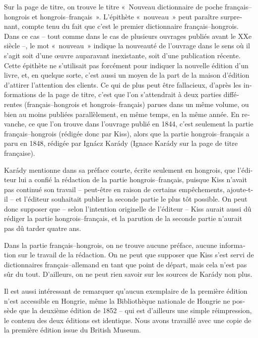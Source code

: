 \documentclass[output=paper,colorlinks,citecolor=brown,arabicfont,chinesefont,booklanguage=french]{langscibook}
\begin{document}
\begin{otherlanguage}{french}
Sur la page de titre, on trouve le titre «~Nouveau dictionnaire de poche français–hongrois et hongrois–français~». L’épithète «~nouveau~» peut paraître surprenant, compte tenu du fait que c’est le premier dictionnaire français–hongrois. Dans ce cas – tout comme dans le cas de plusieurs ouvrages publiés avant le XXe siècle –, le mot «~nouveau~» indique la nouveauté de l’ouvrage dans le sens où il s’agit soit d’une œuvre auparavant inexistante, soit d’une publication récente. Cette épithète ne s’utilisait pas forcément pour indiquer la nouvelle édition d’un livre, et, en quelque sorte, c’est aussi un moyen de la part de la maison d’édition d’attirer l’attention des clients. Ce qui de plus peut être fallacieux, d’après les informations de la page de titre, c’est que l’on s’attendrait à deux parties différentes (français–hongrois et hongrois–français) parues dans un même volume, ou bien au moins publiées parallèlement, en même temps, en la même année. En revanche, ce que l’on trouve dans l’ouvrage publié en 1844, c’est seulement la partie français–hongrois (rédigée donc par Kiss), alors que la partie hongrois–français a paru en 1848, rédigée par Ignácz Karády (Ignace Karády sur la page de titre française). 

Karády mentionne dans sa préface courte, écrite seulement en hongrois, que l’éditeur lui a confié la rédaction de la partie hongrois–français, puisque Kiss n’avait pas continué son travail – peut-être en raison de certains empêchements, ajoute-t-il – et l’éditeur souhaitait publier la seconde partie le plus tôt possible. On peut donc supposer que – selon l’intention originelle de l’éditeur – Kiss aurait aussi dû rédiger la partie hongrois–français, et la parution de la seconde partie n’aurait pas dû tarder quatre ans.

Dans la partie français–hongrois, on ne trouve aucune préface, aucune information sur le travail de la rédaction. On ne peut que supposer que Kiss s’est servi de dictionnaires français–allemand en tant que point de départ, mais cela n’est pas sûr du tout. D’ailleurs, on ne peut rien savoir sur les sources de Karády non plus. 

Il est aussi intéressant de remarquer qu’aucun exemplaire de la première édition n’est accessible en Hongrie, même la Bibliothèque nationale de Hongrie ne possède que la deuxième édition de 1852 – qui est d’ailleurs une simple réimpression, le contenu des deux éditions est identique. Nous avons travaillé avec une copie de la première édition issue du British Museum. 


\end{otherlanguage}
\end{document}
